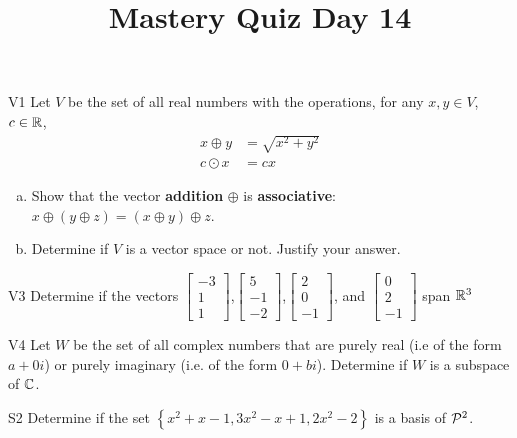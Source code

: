 \documentclass{sbgLAquiz}
\title{Mastery Quiz Day 14 }
\begin{document}
\begin{problem}{V1}
Let $V$ be the set of all real numbers with the operations, for any $x, y \in V$, $c \in \IR$,
\begin{align*}
x \oplus y &= \sqrt{x^2+y^2} \\
c \odot x &= c x
\end{align*}
\begin{enumerate}[(a)]
\item Show that the vector \textbf{addition} $\oplus$ is \textbf{associative}:
      \(x \oplus (y \oplus z)=(x\oplus y)\oplus z\).
\item Determine if $V$ is a vector space or not.  Justify your answer.
\end{enumerate}
\end{problem}

\begin{problem}{V3}
Determine if the vectors  $\begin{bmatrix} -3 \\ 1 \\ 1 \end{bmatrix}$,$\begin{bmatrix} 5 \\ -1 \\ -2 \end{bmatrix}$,$\begin{bmatrix}2 \\ 0 \\ -1 \end{bmatrix}$, and $\begin{bmatrix} 0 \\ 2 \\ -1\end{bmatrix}$ span $\IR^3$
\end{problem}
\newpage

\begin{problem}{V4} Let \(W\) be the set of all complex numbers
that are purely real (i.e of the form $a+0i$)  or purely imaginary (i.e. of the form $0+bi$).
Determine if \(W\) is a subspace of \(\IC\).
\end{problem}

\begin{problem}{S2}
Determine if the set $\left\{ x^2+x-1, 3x^2-x+1, 2x^2-2 \right\}$ is a basis of $\P^2$.
\end{problem}
\end{document}
